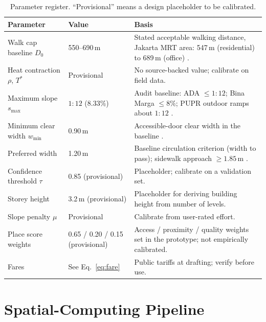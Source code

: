 \documentclass[11pt,a4paper]{article}
\begin{document}
\begin{table}[H]
\centering
\small
\caption{Parameter register. ``Provisional'' means a design placeholder to be calibrated.}
\label{tab:params}
\renewcommand{\arraystretch}{1.15}
\begin{tabularx}{\textwidth}{@{}P{3.2cm} P{2.6cm} Y@{}}
\toprule
\textbf{Parameter} & \textbf{Value} & \textbf{Basis} \\
\midrule
Walk cap baseline $D_0$ & 550--690\,m & Stated acceptable walking distance, Jakarta MRT area: 547\,m (residential) to 689\,m (office) \cite{afkara2020walking}. \\
Heat contraction $\rho$, $T^{*}$ & Provisional & No source-backed value; calibrate on field data. \\
Maximum slope $s_{\max}$ & $1{:}12$ (8.33\%) & Audit baseline: ADA $\le1{:}12$; Bina Marga $\le8\%$; PUPR outdoor ramps about $1{:}12$ \cite{ada2010standards,binamarga2023,permenpupr14_2017}. \\
Minimum clear width $w_{\min}$ & 0.90\,m & Accessible-door clear width in the baseline \cite{permenpupr14_2017,ada2010standards}. \\
Preferred width & 1.20\,m & Baseline circulation criterion (width to pass); sidewalk approach $\ge1.85$\,m \cite{binamarga2023}. \\
Confidence threshold $\tau$ & 0.85 (provisional) & Placeholder; calibrate on a validation set. \\
Storey height & 3.2\,m (provisional) & Placeholder for deriving building height from number of levels. \\
Slope penalty $\mu$ & Provisional & Calibrate from user-rated effort. \\
Place score weights & 0.65 / 0.20 / 0.15 (provisional) & Access / proximity / quality weights set in the prototype; not empirically calibrated. \\
Fares & See Eq.~\eqref{eq:fare} & Public tariffs at drafting; verify before use. \\
\bottomrule
\end{tabularx}
\end{table}

\section{Spatial-Computing Pipeline}\label{sec:pipeline}
\end{document}
